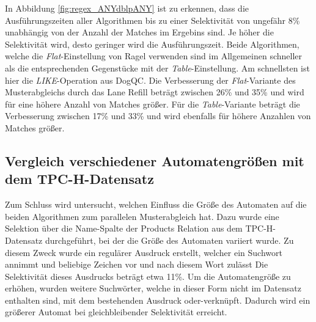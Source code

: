 In Abbildung \ref{fig:regex_ANYdblpANY} ist zu erkennen, dass die Ausführungszeiten aller Algorithmen bis zu einer Selektivität von ungefähr 8\% unabhängig von der Anzahl der Matches im Ergebins sind.
Je höher die Selektivität wird, desto geringer wird die Ausführungszeit.
Beide Algorithmen, welche die \emph{Flat}-Einstellung von Ragel verwenden sind im Allgemeinen schneller als die entsprechenden Gegenstücke mit der \emph{Table}-Einstellung.
Am schnellsten ist hier die \emph{LIKE}-Operation aus DogQC.
Die Verbesserung der \emph{Flat}-Variante des Musterabgleichs durch das Lane Refill beträgt zwischen 26\% und 35\% und wird für eine höhere Anzahl von Matches größer.
Für die \emph{Table}-Variante beträgt die Verbesserung zwischen 17\% und 33\% und wird ebenfalls für höhere Anzahlen von Matches größer.

\subsection{Vergleich verschiedener Automatengrößen mit dem TPC-H-Datensatz}
\label{sec:regex_evaluation_beobachtung_5}

Zum Schluss wird untersucht, welchen Einfluss die Größe des Automaten auf die beiden Algorithmen zum parallelen Musterabgleich hat.
Dazu wurde eine Selektion über die Name-Spalte der Products Relation aus dem TPC-H-Datensatz durchgeführt, bei der die Größe des Automaten variiert wurde.
Zu diesem Zweck wurde ein regulärer Ausdruck erstellt, welcher ein Suchwort annimmt und beliebige Zeichen vor und nach diesem Wort zulässt
Die Selektivität dieses Ausdrucks beträgt etwa 11\%.
Um die Automatengröße zu erhöhen, wurden weitere Suchwörter, welche in dieser Form nicht im Datensatz enthalten sind, mit dem bestehenden Ausdruck oder-verknüpft.
Dadurch wird ein größerer Automat bei gleichbleibender Selektivität erreicht.


